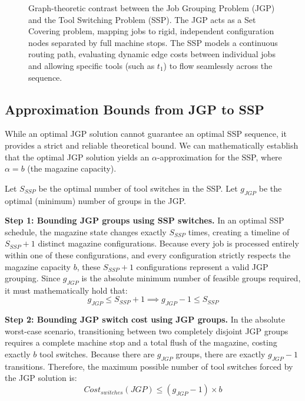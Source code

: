 \documentclass[12pt]{article}
\begin{document}
\begin{figure}[h!]
	\caption{Graph-theoretic contrast between the Job Grouping Problem (JGP) and the Tool Switching Problem (SSP). The JGP acts as a Set Covering problem, mapping jobs to rigid, independent configuration nodes separated by full machine stops. The SSP models a continuous routing path, evaluating dynamic edge costs between individual jobs and allowing specific tools (such as $t_1$) to flow seamlessly across the sequence.}
	\label{fig:jgp_vs_ssp}
\end{figure}

\subsection{Approximation Bounds from JGP to SSP}

While an optimal JGP solution cannot guarantee an optimal SSP sequence, it provides a strict and reliable theoretical bound. We can mathematically establish that the optimal JGP solution yields an $\alpha$-approximation for the SSP, where $\alpha = b$ (the magazine capacity).

Let $S_{SSP}$ be the optimal number of tool switches in the SSP. Let $g_{JGP}$ be the optimal (minimum) number of groups in the JGP.

\textbf{Step 1: Bounding JGP groups using SSP switches.}
In an optimal SSP schedule, the magazine state changes exactly $S_{SSP}$ times, creating a timeline of $S_{SSP} + 1$ distinct magazine configurations. Because every job is processed entirely within one of these configurations, and every configuration strictly respects the magazine capacity $b$, these $S_{SSP} + 1$ configurations represent a valid JGP grouping. Since $g_{JGP}$ is the absolute minimum number of feasible groups required, it must mathematically hold that:
\begin{equation}
	g_{JGP} \le S_{SSP} + 1 \implies g_{JGP} - 1 \le S_{SSP}
\end{equation}

\textbf{Step 2: Bounding JGP switch cost using JGP groups.}
In the absolute worst-case scenario, transitioning between two completely disjoint JGP groups requires a complete machine stop and a total flush of the magazine, costing exactly $b$ tool switches. Because there are $g_{JGP}$ groups, there are exactly $g_{JGP} - 1$ transitions. Therefore, the maximum possible number of tool switches forced by the JGP solution is:
\begin{equation}
	Cost_{switches}(JGP) \le (g_{JGP} - 1) \times b
\end{equation}
\end{document}
